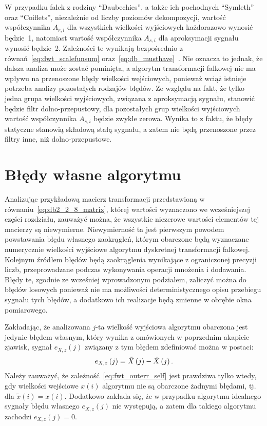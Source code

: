 W przypadku falek z rodziny \enquote{Daubechies}, a także ich pochodnych \enquote{Symleth} oraz \enquote{Coiflets}, niezależnie od liczby poziomów dekompozycji, wartość współczynnika $A_{r,i}$ dla wszystkich wielkości wyjściowych każdorazowo wynosić będzie~\num{1}, natomiast wartość współczynnika $A_{s,i}$ dla aproksymacji sygnału wynosić będzie~\num{2}. Zależności te wynikają bezpośrednio z równań~\eqref{eq:dwt_scalefunsum} oraz~\eqref{eq:db_musthave}~\cite{vonesch_dbbasics, wei_coiflet}. Nie oznacza to jednak, że dalsza analiza może zostać pominięta, a algorytm transformacji falkowej nie ma wpływu na przenoszone błędy wielkości wejściowych, ponieważ wciąż istnieje potrzeba analizy pozostałych rodzajów błędów. Ze względu na fakt, że tylko jedna grupa wielkości wyjściowych, związana z aproksymacją sygnału, stanowić będzie filtr dolno-przepustowy, dla pozostałych grup wielkości wyjściowych wartość współczynnika $A_{s,i}$ będzie zwykle zerowa. Wynika to z faktu, że błędy statyczne stanowią składową stałą sygnału, a zatem nie będą przenoszone przez filtry inne, niż dolno-przepustowe.

\section{Błędy własne algorytmu}

Analizując przykładową macierz transformacji przedstawioną w równaniu~\eqref{eq:db2_2_8_matrix}, której wartości wyznaczono we wcześniejszej części rozdziału, zauważyć można, że wszystkie niezerowe wartości elementów tej macierzy są niewymierne. Niewymierność ta jest pierwszym powodem powstawania błędu własnego zaokrągleń, którym obarczone będą wyznaczane numerycznie wielkości wyjściowe algorytmu dyskretnej transformacji falkowej. Kolejnym źródłem błędów będą zaokrąglenia wynikające z ograniczonej precyzji liczb, przeprowadzane podczas wykonywania operacji mnożenia i dodawania. Błędy te, zgodnie ze wcześniej wprowadzonym podziałem, zaliczyć można do błędów losowych ponieważ nie ma możliwości deterministycznego opisu przebiegu sygnału tych błędów, a dodatkowo ich realizacje będą zmienne w obrębie okna pomiarowego.

Zakładając, że analizowana $j$-ta wielkość wyjściowa algorytmu obarczona jest jedynie błędem własnym, który wynika z omówionych w poprzednim akapicie zjawisk, sygnał $e_{X,z}(j)$ związany z tym błędem zdefiniować można w postaci:
\begin{equation}
e_{X,z} \left(j\right) = \tilde{X} \left(j\right) - \dot{X} \left(j\right) \label{eq:fwt_outerr_self}.
\end{equation}
Należy zauważyć, że zależność~\eqref{eq:fwt_outerr_self} jest prawdziwa tylko wtedy, gdy wielkości wejściowe $x(i)$ algorytmu nie są obarczone żadnymi błędami, tj. dla $\tilde{x}(i) = \dot{x}(i)$. Dodatkowo zakłada się, że w przypadku algorytmu idealnego sygnały błędu własnego $e_{X,z}(j)$ nie występują, a zatem dla takiego algorytmu zachodzi $e_{X,z}(j) = 0$. 

